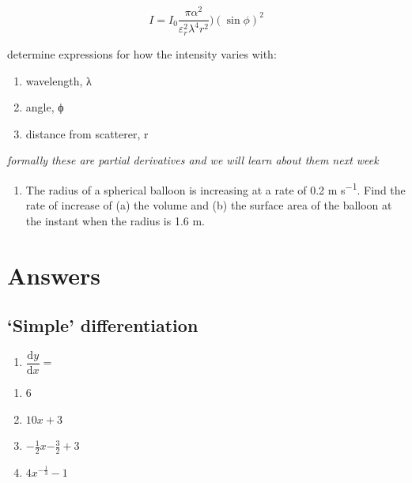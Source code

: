 \documentclass[
]{book}
\providecommand{\tightlist}{%
  \setlength{\itemsep}{0pt}\setlength{\parskip}{0pt}}
\begin{document}
\begin{equation*}
I = I_0 \frac{\pi \alpha ^2}{\varepsilon _r^2 \lambda^4 r^2})(\sin \phi)^2
\end{equation*}

determine expressions for how the intensity varies with:

\begin{enumerate}
\def\labelenumi{\alph{enumi}.}
\tightlist
\item
  wavelength, λ
\item
  angle, ϕ
\item
  distance from scatterer, r
\end{enumerate}

\emph{formally these are partial derivatives and we will learn about them next week}

\begin{enumerate}
\def\labelenumi{\arabic{enumi}.}
\setcounter{enumi}{2}
\tightlist
\item
  The radius of a spherical balloon is increasing at a rate of 0.2 m s\textsuperscript{−1}. Find the rate of increase of (a) the volume and (b) the surface area of the balloon at the instant when the radius is 1.6 m.
\end{enumerate}

\hypertarget{sec:Answers4}{%
\section{Answers}\label{sec:Answers4}}

\hypertarget{simple-differentiation-1}{%
\subsection{`Simple' differentiation}\label{simple-differentiation-1}}

\begin{enumerate}
\def\labelenumi{\arabic{enumi}.}
\tightlist
\item
  \(\dfrac{\textrm{d}y}{\textrm{d}x}=\)
\end{enumerate}

\begin{enumerate}
\def\labelenumi{\alph{enumi}.}
\tightlist
\item
  6
\item
  \(10x+3\)
\item
  \(-\frac{1}{2}x{-\frac{3}{2}}+3\)
\item
  \(4x^{-\frac{1}{3}}-1\)
\end{enumerate}
\end{document}
